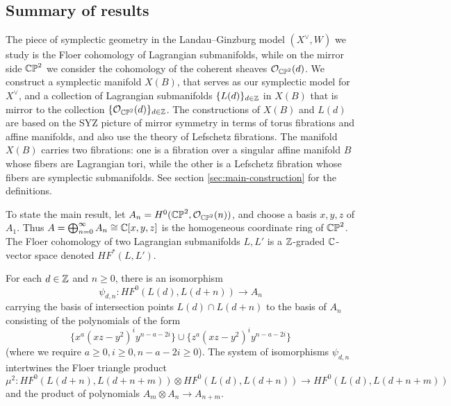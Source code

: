 \documentclass[12pt]{amsart}
\begin{document}
\subsection{Summary of results}
\label{sec:outline}
The piece of symplectic geometry in the Landau--Ginzburg model
$(X^\vee,W)$ we study is the Floer cohomology of Lagrangian
submanifolds, while on the mirror side $\mathbb{CP}^2$ we consider the
cohomology of the coherent sheaves $\mathcal{O}_{\mathbb{CP}^2}(d)$. We construct a
symplectic manifold $X(B)$, that serves as our symplectic model for
$X^\vee$, and a collection of Lagrangian submanifolds $\{L(d)\}_{d\in
  \mathbb{Z}}$ in $X(B)$ that is mirror to the collection
$\{\mathcal{O}_{\mathbb{CP}^2}(d)\}_{d\in \mathbb{Z}}$. The constructions of $X(B)$ and $L(d)$
are based on the SYZ picture of mirror symmetry in terms of torus
fibrations and affine manifolds, and also use the theory of Lefschetz
fibrations. The manifold $X(B)$ carries two fibrations: one is a
fibration over a singular affine manifold $B$ whose fibers are Lagrangian
tori, while the other is a Lefschetz fibration whose fibers are
symplectic submanifolds. See section \ref{sec:main-construction} for
the definitions.

To state the main result, let $A_n = H^0(\mathbb{CP}^2,\mathcal{O}_{\mathbb{CP}^2}(n))$, and
choose a basis $x,y,z$ of $A_1$. Thus $A = \bigoplus_{n=0}^\infty A_n
\cong \mathbb{C}[x,y,z]$ is the homogeneous coordinate ring of $\mathbb{CP}^2$. The Floer cohomology of two Lagrangian submanifolds $L,L'$ is a $\mathbb{Z}$-graded $\mathbb{C}$-vector space denoted $HF^*(L,L')$.
\begin{theorem}
  \label{thm:triangle-products}
  For each $d \in \mathbb{Z}$ and $n \geq 0$, there is an isomorphism
  \begin{equation}
    \psi_{d,n} : HF^0(L(d),L(d+n)) \to A_n
  \end{equation}
  carrying the basis of intersection points $L(d) \cap L(d+n)$ to the
  basis of $A_n$ consisting of the polynomials of the form
  \begin{equation}
    \{x^a(xz-y^2)^iy^{n-a-2i}\} \cup
    \{z^a(xz-y^2)^iy^{n-a-2i}\}
  \end{equation}
  (where we require $a \geq 0, i \geq 0, n-a-2i \geq 0$).
  The system of isomorphisms $\psi_{d,n}$ intertwines the Floer triangle product
  \begin{equation}
    \mu^2: HF^0(L(d+n),L(d+n+m)) \otimes HF^0(L(d),L(d+n)) \to HF^0(L(d),L(d+n+m))
  \end{equation}
  and the product of polynomials $A_m \otimes A_n \to A_{n+m}$.
\end{theorem}
\end{document}
